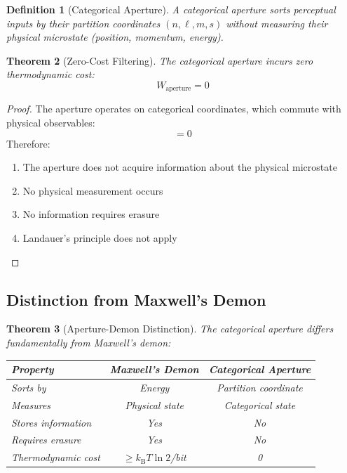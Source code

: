 \documentclass[aps,prd,twocolumn,superscriptaddress,floatfix,nofootinbib]{revtex4-2}
\newtheorem{theorem}{Theorem}[section]
\newtheorem{definition}[theorem]{Definition}
\theoremstyle{remark}
\newcommand{\kB}{k_{\mathrm{B}}}
\begin{document}
\begin{definition}[Categorical Aperture]
\label{def:aperture}
A categorical aperture sorts perceptual inputs by their partition coordinates $(n, \ell, m, s)$ without measuring their physical microstate (position, momentum, energy).
\end{definition}

\begin{theorem}[Zero-Cost Filtering]
\label{thm:zero_cost}
The categorical aperture incurs zero thermodynamic cost:
\begin{equation}
W_{\text{aperture}} = 0
\end{equation}
\end{theorem}

\begin{proof}
The aperture operates on categorical coordinates, which commute with physical observables:
\begin{equation}
[\hat{O}_{\text{cat}}, \hat{O}_{\text{phys}}] = 0
\end{equation}
Therefore:
\begin{enumerate}
\item The aperture does not acquire information about the physical microstate
\item No physical measurement occurs
\item No information requires erasure
\item Landauer's principle does not apply
\end{enumerate}
\end{proof}

\subsection{Distinction from Maxwell's Demon}

\begin{theorem}[Aperture-Demon Distinction]
\label{thm:aperture_demon}
The categorical aperture differs fundamentally from Maxwell's demon:

\begin{center}
\begin{tabular}{@{}lcc@{}}
\toprule
Property & Maxwell's Demon & Categorical Aperture \\
\midrule
Sorts by & Energy & Partition coordinate \\
Measures & Physical state & Categorical state \\
Stores information & Yes & No \\
Requires erasure & Yes & No \\
Thermodynamic cost & $\geq \kB T \ln 2$/bit & 0 \\
\bottomrule
\end{tabular}
\end{center}
\end{theorem}
\end{document}
